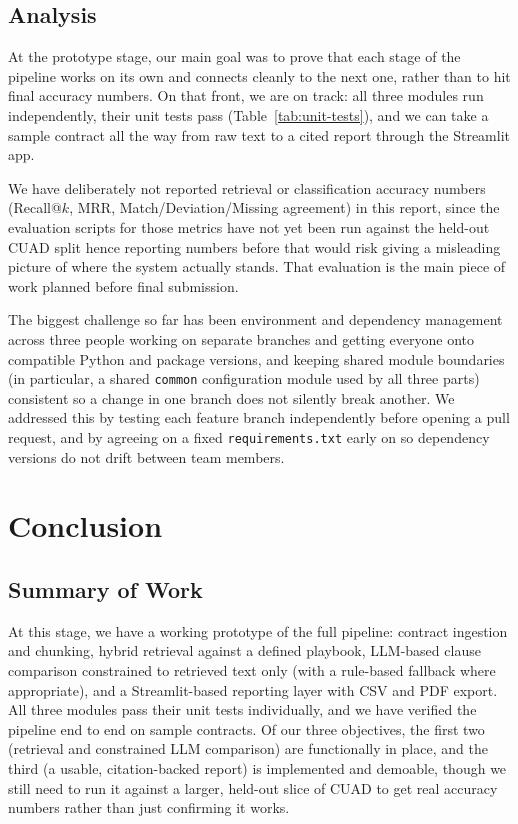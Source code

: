 \documentclass[11pt]{article}
\begin{document}
\subsection{Analysis}

At the prototype stage, our main goal was to prove that each stage of
the pipeline works on its own and connects cleanly to the next one,
rather than to hit final accuracy numbers. On that front, we are on
track: all three modules run independently, their unit tests pass
(Table~\ref{tab:unit-tests}), and we can take a sample contract all the
way from raw text to a cited report through the Streamlit app.

We have deliberately not reported retrieval or classification accuracy
numbers (Recall@$k$, MRR, Match/Deviation/Missing agreement) in this
report, since the evaluation scripts for those metrics have not yet
been run against the held-out CUAD split hence reporting numbers before
that would risk giving a misleading picture of where the system
actually stands. That evaluation is the main piece of work planned
before final submission.

The biggest challenge so far has been environment and dependency
management across three people working on separate branches and
getting everyone onto compatible Python and package versions, and
keeping shared module boundaries (in particular, a shared
\texttt{common} configuration module used by all three parts)
consistent so a change in one branch does not silently break another.
We addressed this by testing each feature branch independently before
opening a pull request, and by agreeing on a fixed
\texttt{requirements.txt} early on so dependency versions do not drift
between team members.



\section{Conclusion}

\subsection{Summary of Work}

At this stage, we have a working prototype of the full pipeline:
contract ingestion and chunking, hybrid retrieval against a defined
playbook, LLM-based clause comparison constrained to retrieved text
only (with a rule-based fallback where appropriate), and a
Streamlit-based reporting layer with CSV and PDF export. All three
modules pass their unit tests individually, and we have verified the
pipeline end to end on sample contracts. Of our three objectives, the
first two (retrieval and constrained LLM comparison) are functionally
in place, and the third (a usable, citation-backed report) is
implemented and demoable, though we still need to run it against a
larger, held-out slice of CUAD to get real accuracy numbers rather than
just confirming it works.
\end{document}
